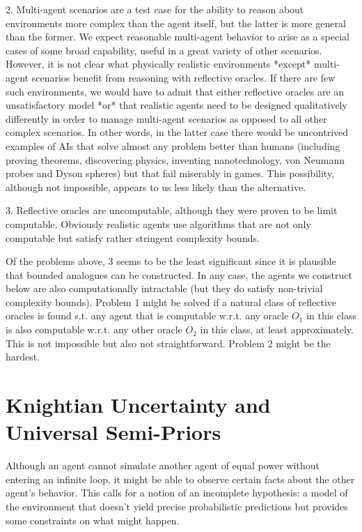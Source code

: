 \documentclass[a4paper]{article}
\begin{document}
2. Multi-agent scenarios are a test case for the ability to reason about environments more complex than the agent itself, but the latter is more general than the former. We expect reasonable multi-agent behavior to arise as a special cases of some broad capability, useful in a great variety of other scenarios. However, it is not clear what physically realistic environments *except* multi-agent scenarios benefit from reasoning with reflective oracles. If there are few such environments, we would have to admit that either reflective oracles are an unsatisfactory model *or* that realistic agents need to be designed qualitatively differently in order to manage multi-agent scenarios as opposed to all other complex scenarios. In other words, in the latter case there would be uncontrived examples of AIs that solve almost any problem better than humans (including proving theorems, discovering physics, inventing nanotechnology, von Neumann probes and Dyson spheres) but that fail miserably in games. This possibility, although not impossible, appears to us less likely than the alternative.

3. Reflective oracles are uncomputable, although they were proven to be limit computable. Obviously realistic agents use algorithms that are not only computable but satisfy rather stringent complexity bounds.

Of the problems above, 3 seems to be the least significant since it is plausible that bounded analogues can be constructed. In any case, the agents we construct below are also computationally intractable (but they do satisfy non-trivial complexity bounds). Problem 1 might be solved if a natural class of reflective oracles is found s.t. any agent that is computable w.r.t. any oracle ${O_1}$ in this class is also computable w.r.t. any other oracle ${O_2}$ in this class, at least approximately. This is not impossible but also not straightforward. Problem 2 might be the hardest.

\section{Knightian Uncertainty and Universal Semi-Priors}

Although an agent cannot simulate another agent of equal power without entering an infinite loop, it might be able to observe certain facts about the other agent's behavior. This calls for a notion of an incomplete hypothesis: a model of the environment that doesn't yield precise probabilistic predictions but provides some constraints on what might happen. 
\end{document}
